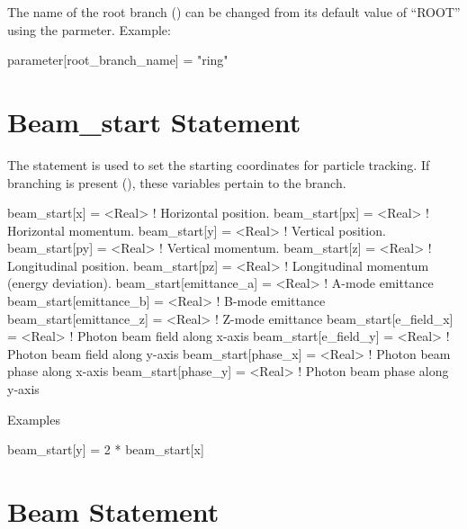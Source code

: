The name of the root branch () can be changed from its 
default value of ``ROOT'' using the  parmeter. Example:
\begin{example}
  parameter[root_branch_name] = "ring"
\end{example}

\section{Beam_start Statement}
\label{s:beam.start}

The  statement is used to set the starting coordinates
for particle tracking. If branching is present (), these variables
pertain to the  branch.
\begin{example}
  beam_start[x]           = <Real>   ! Horizontal position.
  beam_start[px]          = <Real>   ! Horizontal momentum.
  beam_start[y]           = <Real>   ! Vertical position.
  beam_start[py]          = <Real>   ! Vertical momentum.
  beam_start[z]           = <Real>   ! Longitudinal position.
  beam_start[pz]          = <Real>   ! Longitudinal momentum (energy deviation).
  beam_start[emittance_a] = <Real>   ! A-mode emittance
  beam_start[emittance_b] = <Real>   ! B-mode emittance
  beam_start[emittance_z] = <Real>   ! Z-mode emittance
  beam_start[e_field_x]   = <Real>   ! Photon beam field along x-axis
  beam_start[e_field_y]   = <Real>   ! Photon beam field along y-axis
  beam_start[phase_x]     = <Real>   ! Photon beam phase along x-axis
  beam_start[phase_y]     = <Real>   ! Photon beam phase along y-axis
\end{example}

\noindent
Examples
\begin{example}
  beam_start[y] = 2 * beam_start[x]
\end{example}

\section{Beam Statement}

